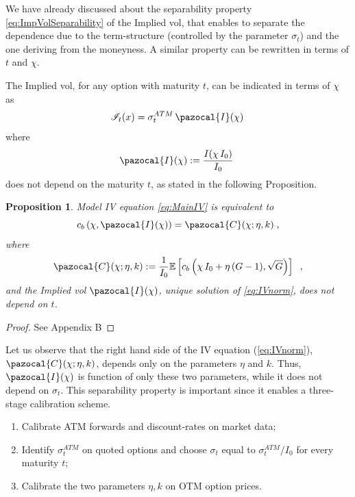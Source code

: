 \documentclass[12pt]{article}
\newcommand{\Ib}{\pazocal{I}}
\newcommand{\Cb}{\pazocal{C}}
\newtheorem{proposition}[theorem]{Proposition}
\theoremstyle{definition}
\theoremstyle{remark}
\numberwithin{theorem}{section}
\numberwithin{proposition}{section}
\numberwithin{lemma}{section}
\numberwithin{corollary}{section}
\numberwithin{definition}{section}
\numberwithin{remark}{section}
\numberwithin{example}{section}
\newcommand{\E}{\mathbb{E}}
\newcommand{\be}{\begin{equation}}
\newcommand{\en}{\end{equation}}
\begin{document}
We have already discussed about the separability property 
\eqref{eq:ImpVolSeparability}
of the Implied vol, that enables to separate the dependence due to the term-structure (controlled by the parameter $\sigma_t$)
and the one deriving from the moneyness.
A similar property can be rewritten in terms of $t$ and $\chi$.

The Implied vol, for any option with maturity $t$,  can be indicated in terms of ${\chi}$ as
\be
{\cal I}_t (x) = \sigma^{ATM}_t \, \Ib({\chi} ) \, 
\label{eq:ImpVolSeparabilityATM}
\en
where
\[
\Ib({\chi}) := \frac{I({\chi} \, { I}_0)}{I_0} \; 
\]
does not depend on the maturity $t$, as stated in the following Proposition.


\begin{proposition}\label{pr:altEqCalibration}
Model IV equation  \eqref{eq:MainIV} is equivalent to
\be
\label{eq:IVnorm}
 {c_{b}\left ({\chi} ,  \Ib({\chi} )\right)} =  \Cb ({\chi}; \eta, k)   \; ,
\en
where
\[
\Cb ({\chi}; \eta, k)   :=
\frac{1}{{ I}_0}
\E \left[ c_b\left({\chi} \, { I}_0 +  \eta \, (G -1) , \sqrt{G}\right) \right] \;\; ,
\]
and the Implied vol $\Ib({\chi})$, unique solution of \eqref{eq:IVnorm}, does not depend on $t$.
\end{proposition}
\begin{proof}
See Appendix B
\end{proof}

Let us observe that the right hand side of the IV equation (\ref{eq:IVnorm}), $ \Cb ({\chi}; \eta, k) $, depends only on the parameters $\eta$ and $k$. Thus, $\Ib({\chi})$ is 
function of only these two parameters, while it does not depend on $\sigma_t$.
This separability property is important since it enables a three-stage calibration scheme.
%
% 
\begin{enumerate}
\item Calibrate ATM forwards and discount-rates on market data;  
\item Identify $\sigma^{ATM}_t$ on quoted options and choose $\sigma_t$ equal to $\sigma^{ATM}_t/I_0$ for every maturity $t$;
\item Calibrate the two parameters $\eta, k$ on OTM option prices.
\end{enumerate}
\end{document}
